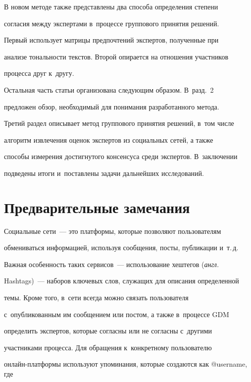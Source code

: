  


  В новом методе также представлены два способа определения степени 


согласия между экспертами в~процессе группового принятия решений.  


Первый использует матрицы предпочтений экспертов, полученные при 


анализе тональности текстов.  Второй опирается на отношения участников 


процесса друг к~другу.


  


  Остальная часть статьи организована следующим образом. В~разд.~2 


предложен обзор, необходимый для понимания разработанного метода. 


Третий раздел описывает метод группового принятия решений, в~том числе 


алгоритм извлечения оценок экспертов из социальных сетей, а также 


способы измерения достигнутого консенсуса среди экспертов. В~заключении 


подведены итоги и~поставлены задачи дальнейших исследований.





\section{Предварительные замечания}





  Социальные сети~--- это платформы, которые позволяют пользователям 


обмениваться информацией, используя сообщения, посты, публикации и~т.\,д. 


Важная особенность таких сервисов~--- использование хештегов (\textit{англ.}\ 


Hashtags)~--- наборов ключевых слов, служащих для описания определенной 


темы. Кроме того, в~сети всегда можно связать пользователя 


с~опубликованным им сообщением или постом, а также в~процессе GDM 


определить экспертов, которые согласны или не согласны с~другими 


участниками процесса. Для обращения к~конкретному пользователю 


онлайн-платформы используют упоминания, которые создаются как @username, где 


